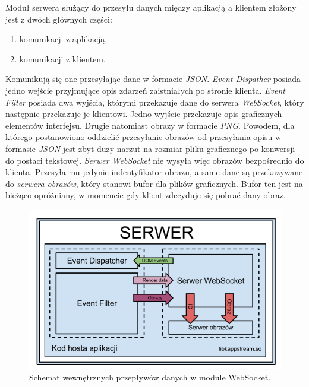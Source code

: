 Moduł serwera służący do przesyłu danych między aplikacją a klientem złożony jest z dwóch głównych części:
\begin{enumerate}
\item komunikacji z aplikacją,
\item komunikacji z klientem.
\end{enumerate}
Komunikują się one przesyłając dane w formacie \emph{JSON}. \emph{Event Dispather} posiada jedno wejście przyjmujące opis zdarzeń zaistniałych po stronie klienta. \emph{Event Filter} posiada dwa wyjścia, którymi przekazuje dane do serwera \emph{WebSocket}, który następnie przekazuje je klientowi. Jedno wyjście przekazuje opis graficznych elementów interfejsu. Drugie natomiast obrazy w formacie \emph{PNG}. Powodem, dla którego postanowiono oddzielić przesyłanie obrazów od przesyłania opisu w formasie \emph{JSON} jest zbyt duży narzut na rozmiar pliku graficznego po konwersji do postaci tekstowej. \emph{Serwer WebSocket} nie wysyła więc obrazów bezpośrednio do klienta. Przesyła mu jedynie indentyfikator obrazu, a same dane są przekazywane do \emph{serwera obrazów}, który stanowi bufor dla plików graficznych. Bufor ten jest na bieżąco opróżniany, w momencie gdy klient zdecyduje się pobrać dany obraz.

\begin{figure}[H]
\centering
\includegraphics[width=0.8\linewidth]{img/arch-lib}
\caption{Schemat wewnętrznych przepływów danych w module WebSocket.}
\label{fig:arch-lib}
\end{figure}
